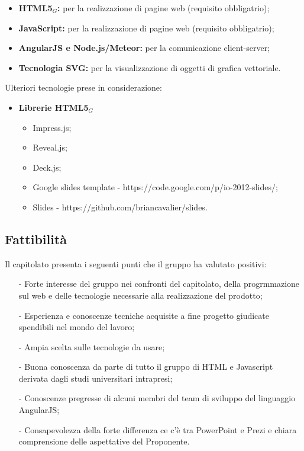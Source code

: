 \begin{itemize}
	\item \textbf{HTML5$_G$:} per la realizzazione di pagine web (requisito obbligatrio);
	\item \textbf{JavaScript:} per la realizzazione di pagine web (requisito obbligatrio);
	\item \textbf{AngularJS e Node.js/Meteor:} per la comunicazione client-server;
	\item \textbf{Tecnologia SVG:} per la visualizzazione di oggetti di grafica vettoriale.
\end{itemize}
Ulteriori tecnologie prese in considerazione:
\begin{itemize}
	\item \textbf{Librerie HTML5$_G$}
	\begin{itemize}
		\item Impress.js;
		\item Reveal.js;
		\item Deck.js;
		\item Google slides template - https://code.google.com/p/io-2012-slides/;
		\item Slides - https://github.com/briancavalier/slides.
	\end{itemize}
\end{itemize}

\subsection{Fattibilità}
Il capitolato presenta i seguenti punti che il gruppo ha valutato positivi:
\begin{itemize}
	\item[-] Forte interesse del gruppo nei confronti del capitolato, della progrmmazione sul web e delle tecnologie necessarie alla realizzazione del prodotto;
	\item[-] Esperienza e conoscenze tecniche acquisite a fine progetto giudicate spendibili nel mondo del lavoro;
	\item[-] Ampia scelta sulle tecnologie da usare;
	\item[-] Buona conoscenza da parte di tutto il gruppo di HTML e Javascript derivata dagli studi universitari intrapresi;
	\item[-] Conoscenze pregresse di alcuni membri del team di sviluppo del linguaggio AngularJS;
	\item[-] Consapevolezza della forte differenza ce c'è tra PowerPoint e Prezi e chiara comprensione delle aspettative del Proponente.
\end{itemize}

